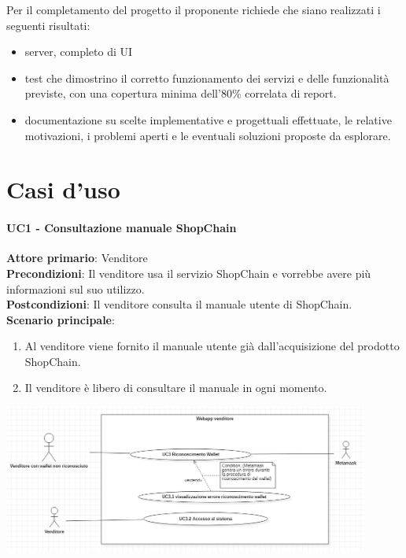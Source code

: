 \documentclass[a4paper, 12pt]{article}
\begin{document}
Per il completamento del progetto il proponente richiede che siano realizzati i seguenti risultati:
\begin{itemize}
\item server, completo di UI
\item test che dimostrino il corretto funzionamento dei servizi e delle funzionalità previste, con una copertura minima dell'80\% correlata di report.
\item documentazione su scelte implementative e progettuali effettuate, le relative motivazioni, i problemi aperti e le eventuali soluzioni proposte da esplorare.
\end{itemize}

\section{Casi d'uso}

\paragraph{UC1 - Consultazione manuale ShopChain}
\textbf{Attore primario}: Venditore\\
\textbf{Precondizioni}: Il venditore usa il servizio ShopChain e vorrebbe avere più informazioni sul suo utilizzo.\\
\textbf{Postcondizioni}: Il venditore consulta il manuale utente di ShopChain.\\
\textbf{Scenario principale}:\\
\begin{enumerate}
\item Al venditore viene fornito il manuale utente già dall'acquisizione del prodotto ShopChain.
\item Il venditore è libero di consultare il manuale in ogni momento.
\end{enumerate}

\includegraphics[width=0.9\textwidth]{UseCase_venditore2.png}
\end{document}
